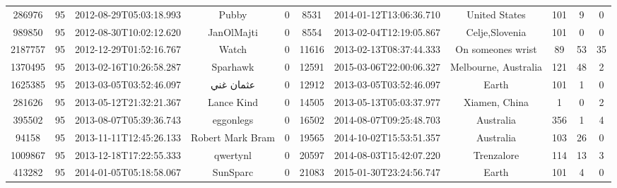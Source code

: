 \documentclass[12pt,a4paper,twoside,openright,titlepage,final]{article}
\begin{document}
\begin{enumerate}
\begin{table}[htbp!]
{\begin{tabular}{@{}ccccccccccc@{}}
			286976             & 95           & 2012-08-29T05:03:18.993 & Pubby                & 0                  & 8531        & 2014-01-12T13:06:36.710 & United States           & 101                 & 9                & 0              \\
			989850             & 95           & 2012-08-30T10:02:12.620 & JanOlMajti           & 0                  & 8554        & 2013-02-04T12:19:05.867 & Celje,Slovenia          & 101                 & 0                & 0              \\
			2187757            & 95           & 2012-12-29T01:52:16.767 & Watch                & 0                  & 11616       & 2013-02-13T08:37:44.333 & On someones wrist       & 89                  & 53               & 35             \\
			1370495            & 95           & 2013-02-16T10:26:58.287 & Sparhawk             & 0                  & 12591       & 2015-03-06T22:00:06.327 & Melbourne, Australia    & 121                 & 48               & 2              \\
			1625385            & 95           & 2013-03-05T03:52:46.097 & عثمان غني            & 0                  & 12912       & 2013-03-05T03:52:46.097 & Earth                   & 101                 & 1                & 0              \\
			281626             & 95           & 2013-05-12T21:32:21.367 & Lance Kind           & 0                  & 14505       & 2013-05-13T05:03:37.977 & Xiamen, China           & 1                   & 0                & 2              \\
			395502             & 95           & 2013-08-07T05:39:36.743 & eggonlegs            & 0                  & 16502       & 2014-08-07T09:25:48.703 & Australia               & 356                 & 1                & 4              \\
			94158              & 95           & 2013-11-11T12:45:26.133 & Robert Mark Bram     & 0                  & 19565       & 2014-10-02T15:53:51.357 & Australia               & 103                 & 26               & 0              \\
			1009867            & 95           & 2013-12-18T17:22:55.333 & qwertynl             & 0                  & 20597       & 2014-08-03T15:42:07.220 & Trenzalore              & 114                 & 13               & 3              \\
			413282             & 95           & 2014-01-05T05:18:58.067 & SunSparc             & 0                  & 21083       & 2015-01-30T23:24:56.747 & Earth                   & 101                 & 4                & 0              \\

\end{tabular}}
\end{table}
\end{enumerate}
\end{document}
